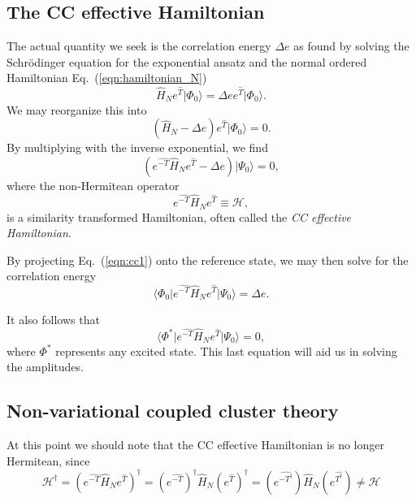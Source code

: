 \subsection{The CC effective Hamiltonian}

The actual quantity we seek is the correlation energy $\Delta e$ as
found by solving the Schrödinger equation for the exponential ansatz
and the normal ordered Hamiltonian Eq.~(\ref{eqn:hamiltonian_N})
\begin{equation}
\hat{H}_N e^{\hat{T}} \vert \Phi_0 \rangle =  \Delta e  e^{\hat{T}} \vert \Phi_0 \rangle.
\end{equation}
We may reorganize this into
\begin{equation}
(\hat{H}_N - \Delta e) e^{\hat{T}} \vert \Phi_0 \rangle = 0.
\end{equation}
By multiplying with the inverse exponential, we find
\begin{equation}
(e^{\hat{-T}} \hat{H}_N e^{\hat{T}} - \Delta e)  \vert \Psi_0 \rangle = 0,
\label{eqn:cc1}
\end{equation}
where the non-Hermitean operator
\begin{equation}
e^{\hat{-T}} \hat{H}_N e^{\hat{T}}  \equiv \mathcal{H},
\end{equation}
is a similarity transformed Hamiltonian, often called the \emph{CC effective Hamiltonian}.

By projecting Eq.~(\ref{eqn:cc1}) onto the reference state, we may then solve for the correlation energy
\begin{equation}
\langle \Phi_0 \vert e^{\hat{-T}} \hat{H}_N e^{\hat{T}} \vert \Psi_0 \rangle = \Delta e.
\label{eqn:cc2}
\end{equation}

It also follows that
\begin{equation}
\langle \Phi^* \vert e^{\hat{-T}} \hat{H}_N e^{\hat{T}} \vert \Psi_0 \rangle = 0,
\label{eqn:cc2}
\end{equation}
where $\Phi^*$ represents any excited state. This last equation will aid us in solving the amplitudes.

\subsection{Non-variational coupled cluster theory}

At this point we should note that the CC effective Hamiltonian is no longer Hermitean, since
\begin{equation}
\mathcal{H}^\dagger = (e^{\hat{-T}} \hat{H}_N e^{\hat{T}})^\dagger = (e^{\hat{-T}})^\dagger \hat{H}_N (e^{\hat{T}})^\dagger = (e^{\hat{-T^\dagger}}) \hat{H}_N (e^{\hat{T^\dagger}}) \neq \mathcal{H}
\end{equation}

